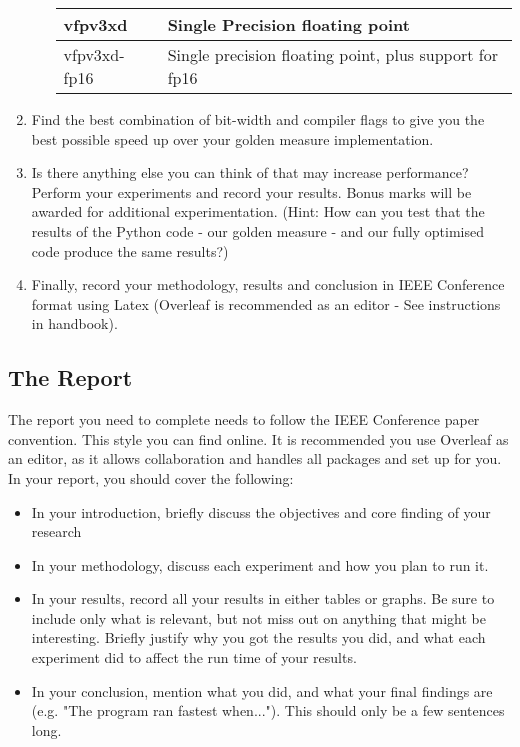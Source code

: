 \begin{enumerate}
\begin{enumerate}
\begin{table}[H]
\begin{tabular}{|l|l|}
            vfpv3xd & Single Precision floating point \\ \hline
            vfpv3xd-fp16 & Single precision floating point, plus support for fp16 \\ \hline
            \end{tabular}
            \end{table}
    \end{enumerate}
    \item Find the best combination of bit-width and compiler flags to give you the best possible speed up over your golden measure implementation. 
    \item Is there anything else you can think of that may increase performance? Perform your experiments and record your results. Bonus marks will be awarded for additional experimentation. (Hint: How can you test that the results of the Python code - our golden measure - and our fully optimised code produce the same results?)
    \item Finally, record your methodology, results and conclusion in IEEE Conference format using Latex (Overleaf is recommended as an editor - See instructions in handbook).
\end{enumerate}

\subsection{The Report}
The report you need to complete needs to follow the IEEE Conference paper convention. This style you can find online. It is recommended you use Overleaf as an editor, as it allows collaboration and handles all packages and set up for you. In your report, you should cover the following:
\begin{itemize}
    \item In your introduction, briefly discuss the objectives and core finding of your research
    \item In your methodology, discuss each experiment and how you plan to run it.
    \item In your results, record all your results in either tables or graphs. Be sure to include only what is relevant, but not miss out on anything that might be interesting. Briefly justify why you got the results you did, and what each experiment did to affect the run time of your results.
    \item In your conclusion, mention what you did, and what your final findings are (e.g. "The program ran fastest when..."). This should only be a few sentences long.
\end{itemize}

